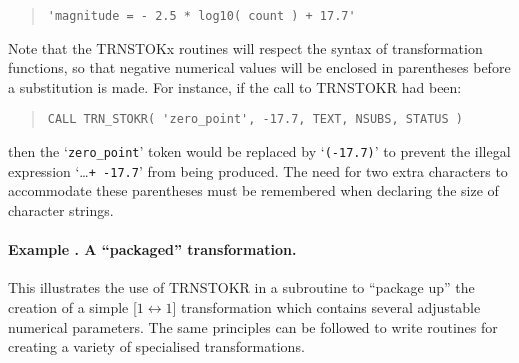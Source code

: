\documentclass[twoside,11pt]{article}
\renewcommand{\_}{\texttt{\symbol{95}}}
\newcommand{\name}[1]{\mbox{\small{#1}}}
\newcounter{examplecounter}
\newcommand{\example}[1]{\addtocounter{examplecounter}{1}
                         \paragraph{\textbf{Example \theexamplecounter. #1}}}
\begin{document}
\begin{quote}
\begin{verbatim}
'magnitude = - 2.5 * log10( count ) + 17.7'
\end{verbatim}
\end{quote}

Note that the \name{TRN\_STOKx} routines will respect the syntax of
transformation functions, so that negative numerical values will be enclosed
in parentheses before a substitution is made.
For instance, if the call to \name{TRN\_STOKR} had been:

\begin{quote}
\begin{verbatim}
CALL TRN_STOKR( 'zero_point', -17.7, TEXT, NSUBS, STATUS )
\end{verbatim}
\end{quote}

then the `\verb#zero_point#' token would be replaced by `\verb#(-17.7)#' to
prevent the illegal expression \mbox{`\ldots \texttt{+ -17.7}'} from being
produced.
The need for two extra characters to accommodate these parentheses must be
remembered when declaring the size of character strings.

\example{A ``packaged'' transformation.}
This illustrates the use of \name{TRN\_STOKR} in a subroutine to
``package up'' the creation of a simple \mbox{[$1 \leftrightarrow 1$]}
transformation which contains several adjustable numerical parameters.
The same principles can be followed to write routines for creating a variety
of specialised transformations.
\end{document}
